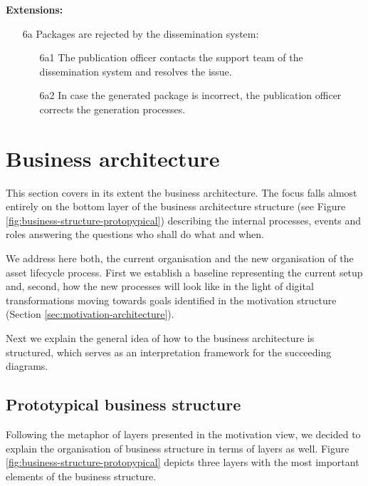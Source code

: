 	\textbf{Extensions:}
	\begin{enumerate}
		\item [6a] Packages are rejected by the dissemination system:
		\begin{enumerate}
			\item [6a1] The publication officer contacts the support team of the dissemination system and resolves the issue. 
			\item [6a2] In case the generated package is incorrect, the publication officer corrects the generation processes.
		\end{enumerate}
	\end{enumerate}
	
\section{Business architecture}
\label{sec:business-architecture}
	
	This section covers in its extent the business architecture. The focus falls almost entirely on the bottom layer of the business architecture structure (see Figure \ref{fig:business-structure-protopypical}) describing the internal processes, events and roles answering the questions who shall do what and when.
	
	
	We address here both, the current organisation and the new organisation of the asset lifecycle process. First we establish a baseline representing the current setup and, second, how the new processes will look like in the light of digital transformations moving towards goals identified in the motivation structure (Section \ref{sec:motivation-architecture}).
	
	Next we explain the general idea of how to the business architecture is structured, which serves as an interpretation framework for the succeeding diagrams. 	
	
	\subsection{Prototypical business structure}
	
	Following the metaphor of layers presented in the motivation view, we decided to explain the  organisation of business structure in terms of layers as well. Figure \ref{fig:business-structure-protopypical} depicts three layers with the most important elements of the business structure. 
	
	
